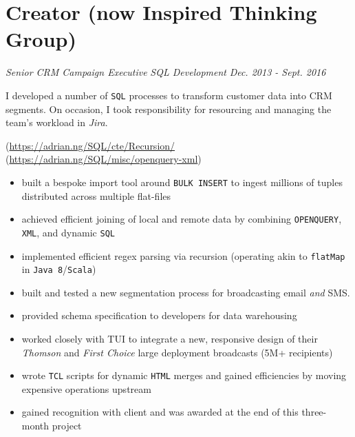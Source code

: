 \documentclass[letterpaper,11pt]{article}
\begin{document}
\section{Creator (now Inspired Thinking Group)}
\textit{Senior CRM Campaign Executive}
\hfill
\textit{SQL Development}
\hfill
\textit{Dec. 2013 - Sept. 2016}
\begin{paragraph}
	I developed a number of \texttt{SQL} processes to transform customer data into CRM segments.  On occasion, I took responsibility for resourcing and managing the team's workload in \textit{Jira}.
\end{paragraph}
\begin{description}[style=multiline,leftmargin=3cm]
	\item[Virgin Media Segmentation]
	      \quad
	      (\href{https://adrian.ng/SQL/cte/Recursion/}{https://adrian.ng/SQL/cte/Recursion/}
	      \quad
	      (\href{https://adrian.ng/SQL/misc/openquery-xml}{https://adrian.ng/SQL/misc/openquery-xml})
	      \small
	      \begin{itemize}
		      \item built a bespoke import tool around \texttt{BULK INSERT} to ingest millions of tuples distributed across multiple flat-files
		      \item achieved efficient joining of local and remote data by  combining \texttt{OPENQUERY}, \texttt{XML}, and dynamic \texttt{SQL}
		      \item implemented efficient regex parsing via recursion (operating akin to \texttt{flatMap} in \texttt{Java 8}/\texttt{Scala})
	      \end{itemize}
	\item[Volkswagen Onboarding]
	      \begin{itemize}
		      \item built and tested a new segmentation process for broadcasting email \textit{and} SMS.
		      \item provided schema specification to developers for data warehousing
	      \end{itemize}
	\item[TUI Redesign]
	      \begin{itemize}
		      \item worked closely with TUI to integrate a new, responsive design of their \textit{Thomson} and \textit{First Choice} large deployment broadcasts (5M+ recipients)
		      \item wrote \texttt{TCL} scripts for dynamic \texttt{HTML} merges and gained efficiencies by moving expensive operations upstream
		      \item gained recognition with client and was awarded at the end of this three-month project
	      \end{itemize}
\end{description}
\end{document}
